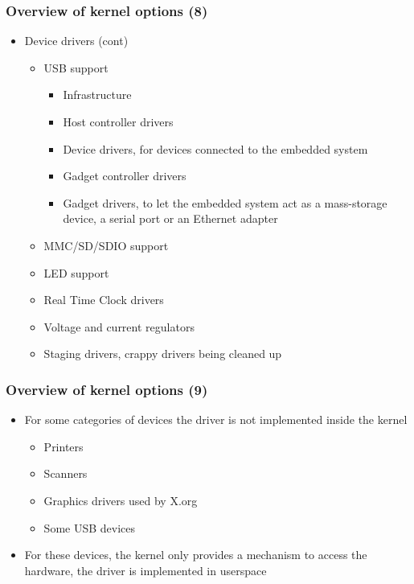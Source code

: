 \begin{frame}
  \frametitle{Overview of kernel options (8)}
  \begin{itemize}
  \item Device drivers (cont)
    \begin{itemize}
    \item USB support
      \begin{itemize}
      \item Infrastructure
      \item Host controller drivers
      \item Device drivers, for devices connected to the embedded system
      \item Gadget controller drivers
      \item Gadget drivers, to let the embedded system act as a
        mass-storage device, a serial port or an Ethernet adapter
      \end{itemize}
    \item MMC/SD/SDIO support
    \item LED support
    \item Real Time Clock drivers
    \item Voltage and current regulators
    \item Staging drivers, crappy drivers being cleaned up
    \end{itemize}
  \end{itemize}
\end{frame}

\begin{frame}
  \frametitle{Overview of kernel options (9)}
  \begin{itemize}
  \item For some categories of devices the driver is not implemented
    inside the kernel
    \begin{itemize}
    \item Printers
    \item Scanners
    \item Graphics drivers used by X.org
    \item Some USB devices
    \end{itemize}
  \item For these devices, the kernel only provides a mechanism to
    access the hardware, the driver is implemented in userspace
  \end{itemize}
\end{frame}

